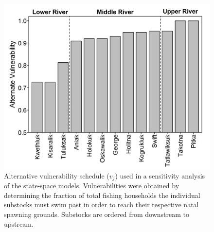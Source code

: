 \documentclass[12pt,]{book}
\theoremstyle{definition}
\theoremstyle{definition}
\theoremstyle{definition}
\theoremstyle{remark}
\begin{document}
\clearpage

\begin{figure}
  \centering
  \includegraphics{img/Ch4/alt-vuln-fig.jpg}
  \caption{Alternative vulnerability schedule ($v_j$) used in a sensitivity analysis of the state-space models. Vulnerabilities were obtained by determining the fraction of total fishing households the individual substocks must swim past in order to reach their respective natal spawning grounds. Substocks are ordered from downstream to upstream.}
  \label{fig:alt-vuln-fig}
\end{figure}

\clearpage
\end{document}

